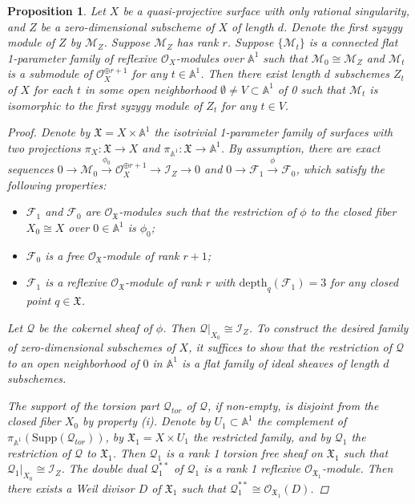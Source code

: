 \documentclass{amsart}[12pt]
\newtheorem{prop}[theorem]{Proposition}
\theoremstyle{definition}
\theoremstyle{remark}
\numberwithin{equation}{section}
\begin{document}
\begin{prop}\label{families}
Let $X$ be a quasi-projective surface with only rational singularity, and $Z$ be a zero-dimensional subscheme of $X$ of length $d$. Denote the first syzygy module of $Z$ by $\mathcal{M}_Z$. Suppose $\mathcal{M}_Z$ has rank $r$. Suppose $\{\mathcal{M}_t\}$ is a connected flat 1-parameter family of reflexive $\mathcal{O}_X$-modules over $\mathbb{A}^1$ such that $\mathcal{M}_0 \cong \mathcal{M}_Z$ and $\mathcal{M}_t$ is a submodule of $\mathcal{O}_X^{\oplus r + 1}$ for any $t \in \mathbb{A}^1$. Then there exist length $d$ subschemes $Z_t$ of $X$ for each $t$ in some open neighborhood $\emptyset \neq V \subset \mathbb{A}^1$ of 0 such that $\mathcal{M}_t$ is isomorphic to the first syzygy module of $Z_t$ for any $t \in V$.
\begin{proof}
Denote by $\mathfrak{X} = X \times \mathbb{A}^1$ the isotrivial 1-parameter family of surfaces with two projections $\pi_X: \mathfrak{X} \to X$ and $\pi_{\mathbb{A}^1}: \mathfrak{X} \to \mathbb{A}^1$. By assumption, there are exact sequences $0 \to \mathcal{M}_0 \xrightarrow{\phi_0} \mathcal{O}_X^{\oplus r + 1} \to \mathcal{I}_Z \to 0$ and $0 \to \mathcal{F}_1 \xrightarrow{\phi} \mathcal{F}_0$, which satisfy the following properties:
\begin{itemize}
\item[(i)] $\mathcal{F}_1$ and $\mathcal{F}_0$ are $\mathcal{O}_{\mathfrak{X}}$-modules such that the restriction of $\phi$ to the closed fiber $X_0 \cong X$ over $0 \in \mathbb{A}^1$ is $\phi_0$;
\item[(ii)] $\mathcal{F}_0$ is a free $\mathcal{O}_{\mathfrak{X}}$-module of rank $r + 1$;
\item[(iii)] $\mathcal{F}_1$ is a reflexive $\mathcal{O}_{\mathfrak{X}}$-module of rank $r$ with $\mathrm{depth}_q(\mathcal{F}_1) = 3$ for any closed point $q \in \mathfrak{X}$.
\end{itemize}

Let $\mathcal{Q}$ be the cokernel sheaf of $\phi$. Then $\mathcal{Q} \vert_{X_0} \cong \mathcal{I}_Z$. To construct the desired family of zero-dimensional subschemes of $X$, it suffices to show that the restriction of $\mathcal{Q}$ to an open neighborhood of $0$ in $\mathbb{A}^1$ is a flat family of ideal sheaves of length $d$ subschemes. 

The support of the torsion part $\mathcal{Q}_{tor}$ of $\mathcal{Q}$, if non-empty, is disjoint from the closed fiber $X_0$ by property (i). Denote by $U_1 \subset  \mathbb{A}^1$ the complement of $\pi_{\mathbb{A}^1}(\mathrm{Supp} (\mathcal{Q}_{tor}))$, by $\mathfrak{X}_1 = X \times U_1$ the restricted family, and by $\mathcal{Q}_1$ the restriction of $\mathcal{Q}$ to $\mathfrak{X}_1$. Then $\mathcal{Q}_1$ is a rank 1 torsion free sheaf on $\mathfrak{X}_1$ such that $\mathcal{Q}_1 \vert_{X_0} \cong \mathcal{I}_Z$. The double dual $\mathcal{Q}_1^{**}$ of $\mathcal{Q}_1$ is a rank 1 reflexive $\mathcal{O}_{\mathfrak{X}_1}$-module. Then there exists a Weil divisor $D$ of $\mathfrak{X}_1$ such that $\mathcal{Q}_1^{**} \cong \mathcal{O}_{\mathfrak{X}_1}(D)$. 


\end{proof}
\end{prop}
\end{document}
